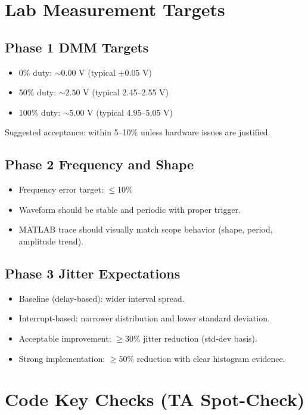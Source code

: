 \documentclass[11pt,letterpaper]{article}
\begin{document}
\section{Lab Measurement Targets}

\subsection*{Phase 1 DMM Targets}
\begin{itemize}[leftmargin=1.2em]
    \item 0\% duty: $\sim 0.00$ V (typical $\pm 0.05$ V)
    \item 50\% duty: $\sim 2.50$ V (typical 2.45--2.55 V)
    \item 100\% duty: $\sim 5.00$ V (typical 4.95--5.05 V)
\end{itemize}
Suggested acceptance: within 5--10\% unless hardware issues are justified.

\subsection*{Phase 2 Frequency and Shape}
\begin{itemize}[leftmargin=1.2em]
    \item Frequency error target: $\le 10\%$
    \item Waveform should be stable and periodic with proper trigger.
    \item MATLAB trace should visually match scope behavior (shape, period, amplitude trend).
\end{itemize}

\subsection*{Phase 3 Jitter Expectations}
\begin{itemize}[leftmargin=1.2em]
    \item Baseline (delay-based): wider interval spread.
    \item Interrupt-based: narrower distribution and lower standard deviation.
    \item Acceptable improvement: $\ge 30\%$ jitter reduction (std-dev basis).
    \item Strong implementation: $\ge 50\%$ reduction with clear histogram evidence.
\end{itemize}

\section{Code Key Checks (TA Spot-Check)}
\end{document}
